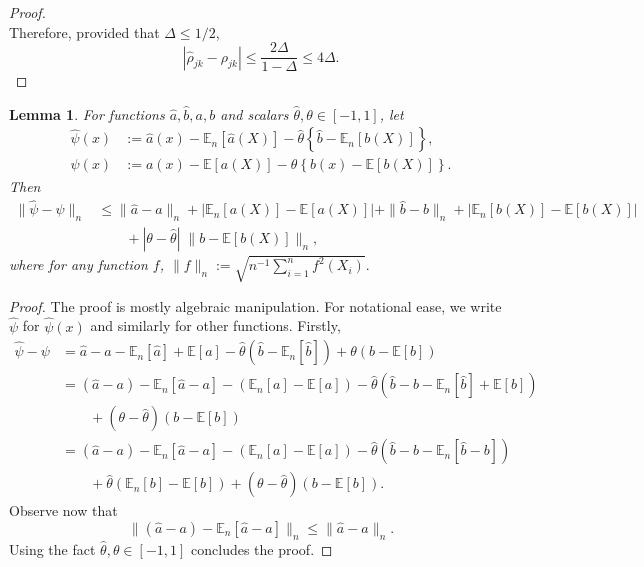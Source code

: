 \documentclass[11pt]{article}
\let\hat\widehat
\newtheorem{lemma}[theorem]{Lemma}
\begin{document}
\begin{appendices}
\begin{proof}
\[\]
Therefore, provided that $\Delta \leq 1/2$,
\[
\left|\widehat{\rho}_{jk} - \rho_{jk}\right| \le \frac{2\Delta}{1 - \Delta} \leq 4 \Delta.
\]
\end{proof}
\begin{lemma}\label{lem:psihat-minus-psi-part1}
For functions $\widehat{a}, \widehat{b}, a, b$ and scalars $\hat{\theta}, \theta\in[-1, 1]$, let
\begin{align*}
\widehat{\psi}(x) &:= \widehat{a}(x) - \mathbb{E}_n[\widehat{a}(X)] - \widehat{\theta}\left\{\widehat{b} - \mathbb{E}_n[b(X)]\right\},\\
\psi(x) &:= a(x) - \mathbb{E}[a(X)] - \theta\left\{b(x) - \mathbb{E}[b(X)]\right\}.
\end{align*}
Then
\begin{align*}
\|\widehat{\psi} - \psi\|_{n} &\le \|\widehat{a} - a\|_n + |\mathbb{E}_n[a(X)] - \mathbb{E}[a(X)]| + \|\widehat{b} - b\|_n + |\mathbb{E}_n[b(X)] - \mathbb{E}[b(X)]|\\
&\qquad+ |\theta - \widehat{\theta}|\;\|b - \mathbb{E}[b(X)]\|_n,
\end{align*}
where for any function $f$, $\|f\|_n := \sqrt{n^{-1}\sum_{i=1}^n f^2(X_i)}.$
\end{lemma}
\begin{proof}
The proof is mostly algebraic manipulation. For notational ease, we write $\widehat{\psi}$ for $\widehat{\psi}(x)$ and similarly for other functions. Firstly,
\begin{align*}
\widehat{\psi} - \psi &= \widehat{a} - a - \mathbb{E}_n[\widehat{a}] + \mathbb{E}[a] - \widehat{\theta}(\widehat{b} - \mathbb{E}_n[\widehat{b}]) + \theta(b - \mathbb{E}[b])\\
&= (\widehat{a} - a) - \mathbb{E}_n[\widehat{a} - a] - (\mathbb{E}_n[a] - \mathbb{E}[a]) - \widehat{\theta}(\widehat{b} - b - \mathbb{E}_n[\widehat{b}] + \mathbb{E}[b])\\
&\qquad+ (\theta - \widehat{\theta})(b - \mathbb{E}[b])\\
&= (\widehat{a} - a) - \mathbb{E}_n[\widehat{a} - a] - (\mathbb{E}_n[a] - \mathbb{E}[a]) - \widehat{\theta}(\widehat{b} - b - \mathbb{E}_n[\widehat{b} - b])\\
&\qquad + \widehat{\theta}(\mathbb{E}_n[b] - \mathbb{E}[b]) + (\theta - \widehat{\theta})(b - \mathbb{E}[b]).
\end{align*}
Observe now that
\[
\|(\widehat{a} - a) - \mathbb{E}_n[\widehat{a} - a]\|_n \le \|\widehat{a} - a\|_n.
\]
Using the fact $\widehat{\theta}, \theta\in[-1, 1]$ concludes the proof.
\end{proof}

\end{appendices}
\end{document}
